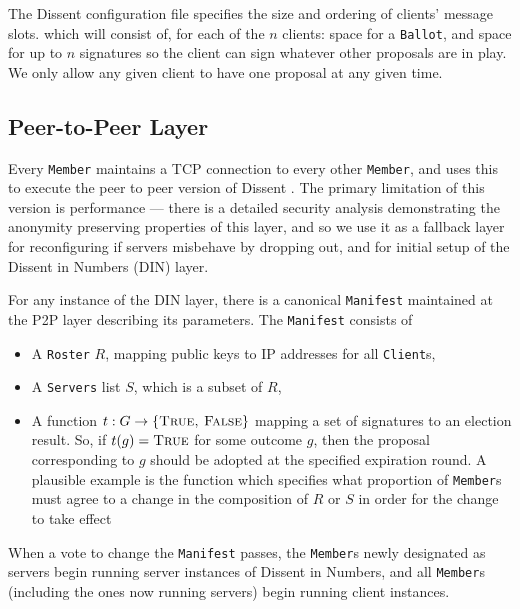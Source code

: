 The Dissent configuration file specifies the size and ordering of clients'
message slots. which will
consist of, for each of the $n$ clients: space for a \texttt{Ballot}, and space
for up to $n$ signatures so the client can sign whatever other proposals are in
play.  We only allow any given client to have one proposal at any given time.

\subsection{Peer-to-Peer Layer}
Every \texttt{Member} maintains a TCP connection to every other \texttt{Member},
and uses this to execute the peer to peer version of Dissent \cite{sec}. The
primary limitation of this version is performance --- there is a detailed
security analysis demonstrating the anonymity preserving properties of this
layer, and so we use it as a fallback layer for reconfiguring if servers
misbehave by dropping out, and for initial setup of the Dissent in Numbers (DIN)
layer.

For any instance of the DIN layer, there is a canonical \texttt{Manifest}
maintained at the P2P layer describing its parameters. The \texttt{Manifest}
consists of
\begin{itemize}
  \item A \texttt{Roster} $R$, mapping public keys to IP addresses for all
    \texttt{Client}s,
  \item A \texttt{Servers} list $S$, which is a subset of $R$,
  \item A function $t : G \to \{\textsc{True, False}\}$ mapping a set of
    signatures to an election result. So, if $t(g) = \textsc{True}$ for some
    outcome $g$, then the proposal corresponding to $g$ should
    be adopted at the specified expiration round. A plausible example is the
    function which specifies what proportion of \texttt{Member}s must agree to a
    change in the composition of $R$ or $S$ in order for the change to take
    effect
\end{itemize}

When a vote to change the \texttt{Manifest} passes, the \texttt{Member}s newly
designated as servers begin running server instances of Dissent in Numbers, and
all \texttt{Member}s (including the ones now running servers) begin running
client instances.

